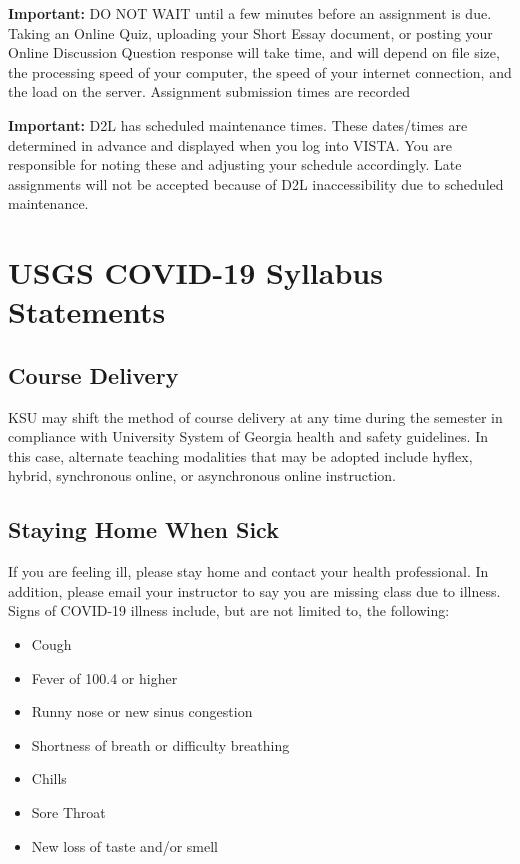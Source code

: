 \documentclass[11pt,]{article}
\providecommand{\tightlist}{%
  \setlength{\itemsep}{0pt}\setlength{\parskip}{0pt}}
\begin{document}
\textbf{Important:} DO NOT WAIT until a few minutes before an assignment is due. Taking an Online Quiz, uploading your Short
Essay document, or posting your Online Discussion Question response will take time, and will depend on file size, the
processing speed of your computer, the speed of your internet connection, and the load on the server. Assignment
submission times are recorded

\textbf{Important:} D2L has scheduled maintenance times. These dates/times are determined in advance and displayed when
you log into VISTA. You are responsible for noting these and adjusting your schedule accordingly. Late assignments will
not be accepted because of D2L inaccessibility due to scheduled maintenance.

\hypertarget{usgs-covid-19-syllabus-statements}{%
\section{USGS COVID-19 Syllabus Statements}\label{usgs-covid-19-syllabus-statements}}

\hypertarget{course-delivery}{%
\subsection{Course Delivery}\label{course-delivery}}

KSU may shift the method of course delivery at any time during the semester in compliance with University System of Georgia health and safety guidelines. In this case, alternate teaching modalities that may be adopted include hyflex, hybrid, synchronous online, or asynchronous online instruction.

\hypertarget{staying-home-when-sick}{%
\subsection{Staying Home When Sick}\label{staying-home-when-sick}}

If you are feeling ill, please stay home and contact your health professional. In addition, please email your instructor to say you are missing class due to illness. Signs of COVID-19 illness include, but are not limited to, the following:

\begin{itemize}
\tightlist
\item
  Cough
\item
  Fever of 100.4 or higher
\item
  Runny nose or new sinus congestion
\item
  Shortness of breath or difficulty breathing
\item
  Chills
\item
  Sore Throat
\item
  New loss of taste and/or smell
\end{itemize}
\end{document}
